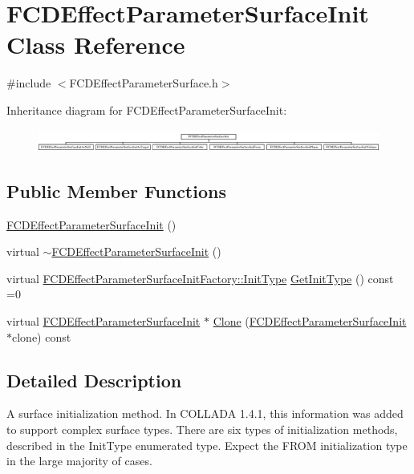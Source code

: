 \hypertarget{classFCDEffectParameterSurfaceInit}{
\section{FCDEffectParameterSurfaceInit Class Reference}
\label{classFCDEffectParameterSurfaceInit}
}


{\ttfamily \#include $<$FCDEffectParameterSurface.h$>$}

Inheritance diagram for FCDEffectParameterSurfaceInit:\begin{figure}[H]
\begin{center}
\leavevmode
\includegraphics[height=0.749665cm]{classFCDEffectParameterSurfaceInit}
\end{center}
\end{figure}
\subsection*{Public Member Functions}
\begin{DoxyCompactItemize}
\item 
\hyperlink{classFCDEffectParameterSurfaceInit_a6b22a5b52b38cbabb51a39c3ea42db74}{FCDEffectParameterSurfaceInit} ()
\item 
virtual \hyperlink{classFCDEffectParameterSurfaceInit_ac350e10e96cbb79e5f4e5b6487052280}{$\sim$FCDEffectParameterSurfaceInit} ()
\item 
virtual \hyperlink{classFCDEffectParameterSurfaceInitFactory_a65e74f1159865702cac5236dd5d83892}{FCDEffectParameterSurfaceInitFactory::InitType} \hyperlink{classFCDEffectParameterSurfaceInit_ad0109233e63c892e5963a3ca67f7108f}{GetInitType} () const =0
\item 
virtual \hyperlink{classFCDEffectParameterSurfaceInit}{FCDEffectParameterSurfaceInit} $\ast$ \hyperlink{classFCDEffectParameterSurfaceInit_ae3ac516773ea5ebb6838ed8a0d10d910}{Clone} (\hyperlink{classFCDEffectParameterSurfaceInit}{FCDEffectParameterSurfaceInit} $\ast$clone) const 
\end{DoxyCompactItemize}


\subsection{Detailed Description}
A surface initialization method. In COLLADA 1.4.1, this information was added to support complex surface types. There are six types of initialization methods, described in the InitType enumerated type. Expect the FROM initialization type in the large majority of cases. 

